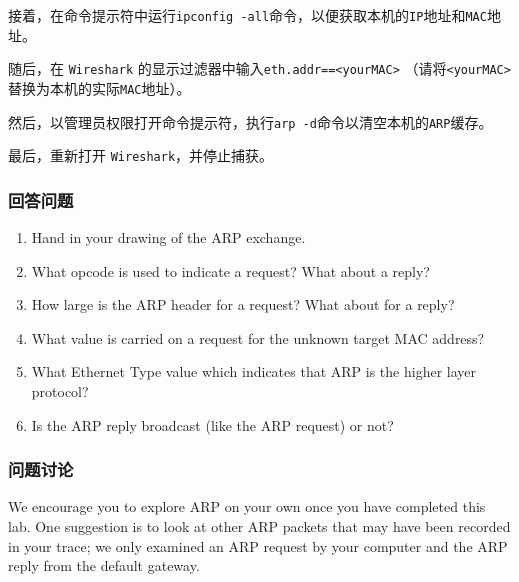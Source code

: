 \documentclass{article}
\begin{document}
	接着，在命令提示符中运行\texttt{ipconfig -all}命令，以便获取本机的\texttt{IP}地址和\texttt{MAC}地址。
	
	随后，在 \texttt{Wireshark} 的显示过滤器中输入\texttt{eth.addr==<yourMAC>}
	（请将\texttt{<yourMAC>}替换为本机的实际\texttt{MAC}地址）。
	
	然后，以管理员权限打开命令提示符，执行\texttt{arp -d}命令以清空本机的\texttt{ARP}缓存。
	
	最后，重新打开 \texttt{Wireshark}，并停止捕获。
	
	\subsubsection{回答问题}
	
	\begin{enumerate}[noitemsep]
		
		\item Hand in your drawing of the ARP exchange.
		\item What opcode is used to indicate a request? What about a reply?
		\item How large is the ARP header for a request? What about for a reply?
		\item What value is carried on a request for the unknown target MAC address?
		\item What Ethernet Type value which indicates that ARP is the higher layer protocol?
		\item Is the ARP reply broadcast (like the ARP request) or not?
		
	\end{enumerate}
	
	\subsubsection{问题讨论}
	
	We encourage you to explore ARP on your own once you have completed this lab. One suggestion is to look at other ARP packets that may have been recorded in your trace; we only examined an ARP request by your computer and the ARP reply from the default gateway. 
	
\end{document}
